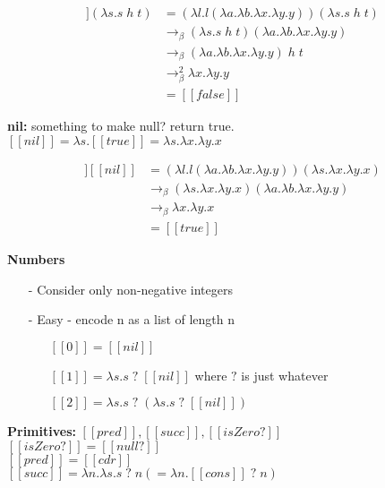 \documentclass[11pt]{article}
\begin{document}
\begin{align*}
[[null?]](\lambda s.s\;h\;t) &= (\lambda l.l(\lambda a.\lambda b.\lambda x.\lambda y.y))(\lambda s.s\;h\;t) \\
&\rightarrow_\beta (\lambda s.s\;h\;t)(\lambda a.\lambda b.\lambda x.\lambda y.y) \\
&\rightarrow_\beta (\lambda a.\lambda b.\lambda x.\lambda y.y)\;h\;t \\
&\rightarrow_\beta^2  \lambda x.\lambda y.y \\
&= [[false]]
\end{align*}

{\bf nil:} something to make null? return true. \\

$[[nil]] = \lambda s.[[true]] = \lambda s.\lambda x.\lambda y.x$

\begin{align*}
[[null?]][[nil]] &= (\lambda l.l(\lambda a.\lambda b.\lambda x.\lambda y.y))(\lambda s.\lambda x.\lambda y.x) \\
&\rightarrow_\beta (\lambda s.\lambda x.\lambda y.x)(\lambda a.\lambda b.\lambda x.\lambda y.y) \\
&\rightarrow_\beta \lambda x.\lambda y.x \\
&= [[true]]
\end{align*}

\textbf{Numbers}
\begin{itemize}
	\item[-] Consider only non-negative integers
	\item[-] Easy - encode n as a list of length n
		\begin{itemize}
			\item[] $[[0]] = [[nil]]$
			\item[] $[[1]] = \lambda s.s\;?\;[[nil]]$ where $?$ is just whatever
			\item[] $[[2]] = \lambda s.s\;?\;(\lambda s.s\;?\;[[nil]])$
		\end{itemize}
\end{itemize}

{\bf Primitives:} $[[pred]], [[succ]], [[isZero?]]$ \\

$[[isZero?]] = [[null?]]$ \\

$[[pred]] = [[cdr]]$ \\

$[[succ]] = \lambda n.\lambda s.s\;?\;n ( = \lambda n.[[cons]]\;?\;n)$ \\
\end{document}
